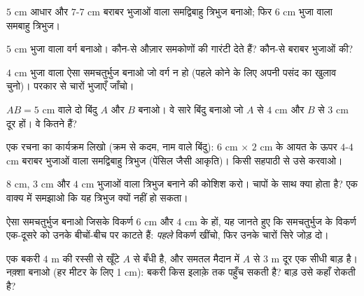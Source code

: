 \begin{exercise}[$\star$]\label{exo:g5:geometry:4}
$5$ cm आधार और $7$-$7$ cm बराबर भुजाओं वाला समद्विबाहु त्रिभुज
बनाओ; फिर $6$ cm भुजा वाला समबाहु त्रिभुज।
\end{exercise}

\begin{exercise}[$\star$]\label{exo:g5:geometry:5}
$5$ cm भुजा वाला वर्ग बनाओ। कौन-से औज़ार समकोणों की गारंटी देते
हैं? कौन-से बराबर भुजाओं की?
\end{exercise}

\begin{exercise}[$\star$]\label{exo:g5:geometry:6}
$4$ cm भुजा वाला ऐसा समचतुर्भुज बनाओ जो वर्ग न हो (पहले कोने के
लिए अपनी पसंद का खुलाव चुनो)। परकार से चारों भुजाएँ जाँचो।
\end{exercise}

\begin{exercise}[$\star$]\label{exo:g5:geometry:7}
$AB = 5$ cm वाले दो बिंदु $A$ और $B$ बनाओ। वे सारे बिंदु बनाओ जो
$A$ से $4$ cm और $B$ से $3$ cm दूर हों। वे कितने
हैं?
\end{exercise}

\begin{exercise}[$\star$]\label{exo:g5:geometry:8}
एक रचना का कार्यक्रम लिखो (क्रम से कदम, नाम वाले बिंदु): $6$ cm
$\times$ $2$ cm के आयत के ऊपर $4$-$4$ cm बराबर भुजाओं वाला
समद्विबाहु त्रिभुज (पेंसिल जैसी आकृति)। किसी सहपाठी से उसे
करवाओ।
\end{exercise}

\begin{exercise}[$\star\star$]\label{exo:g5:geometry:9}
$8$ cm, $3$ cm और $4$ cm भुजाओं वाला त्रिभुज बनाने की कोशिश करो।
चापों के साथ क्या होता है? एक वाक्य में समझाओ कि यह त्रिभुज
क्यों नहीं हो सकता।
\end{exercise}

\begin{exercise}[$\star\star$]\label{exo:g5:geometry:10}
ऐसा समचतुर्भुज बनाओ जिसके विकर्ण $6$ cm और $4$ cm के हों, यह
जानते हुए कि समचतुर्भुज के विकर्ण एक-दूसरे को उनके बीचों-बीच
 पर काटते हैं: \emph{पहले} विकर्ण खींचो, फिर उनके चारों
सिरे जोड़ दो।
\end{exercise}

\begin{exercise}[$\star\star$]\label{exo:g5:geometry:11}
एक बकरी $4$ m की रस्सी से खूँटे $A$ से बँधी है, और समतल मैदान
में $A$ से $3$ m दूर एक सीधी बाड़ है। नक़्शा बनाओ (हर मीटर के
लिए 1 cm): बकरी किस इलाक़े तक पहुँच सकती है? बाड़ उसे कहाँ रोकती
है?
\end{exercise}
